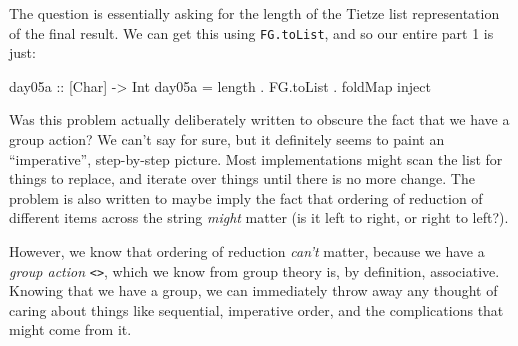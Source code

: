 \documentclass[]{article}
\newenvironment{Shaded}{}{}
\newcommand{\CommentTok}[1]{\textcolor[rgb]{0.38,0.63,0.69}{\textit{#1}}}
\newcommand{\DataTypeTok}[1]{\textcolor[rgb]{0.56,0.13,0.00}{#1}}
\newcommand{\FunctionTok}[1]{\textcolor[rgb]{0.02,0.16,0.49}{#1}}
\newcommand{\KeywordTok}[1]{\textcolor[rgb]{0.00,0.44,0.13}{\textbf{#1}}}
\newcommand{\NormalTok}[1]{#1}
\newcommand{\OtherTok}[1]{\textcolor[rgb]{0.00,0.44,0.13}{#1}}
\begin{document}
\begin{Shaded}
\end{Shaded}

The question is essentially asking for the length of the Tietze list
representation of the final result. We can get this using \texttt{FG.toList},
and so our entire part 1 is just:

\begin{Shaded}
\begin{Highlighting}[]
\OtherTok{day05a ::}\NormalTok{ [}\DataTypeTok{Char}\NormalTok{] }\OtherTok{->} \DataTypeTok{Int}
\NormalTok{day05a }\FunctionTok{=}\NormalTok{ length }\FunctionTok{.}\NormalTok{ FG.toList }\FunctionTok{.}\NormalTok{ foldMap inject}
\end{Highlighting}
\end{Shaded}

Was this problem actually deliberately written to obscure the fact that we have
a group action? We can't say for sure, but it definitely seems to paint an
``imperative'', step-by-step picture. Most implementations might scan the list
for things to replace, and iterate over things until there is no more change.
The problem is also written to maybe imply the fact that ordering of reduction
of different items across the string \emph{might} matter (is it left to right,
or right to left?).

However, we know that ordering of reduction \emph{can't} matter, because we have
a \emph{group action} \texttt{\textless{}\textgreater{}}, which we know from
group theory is, by definition, associative. Knowing that we have a group, we
can immediately throw away any thought of caring about things like sequential,
imperative order, and the complications that might come from it.
\end{document}
